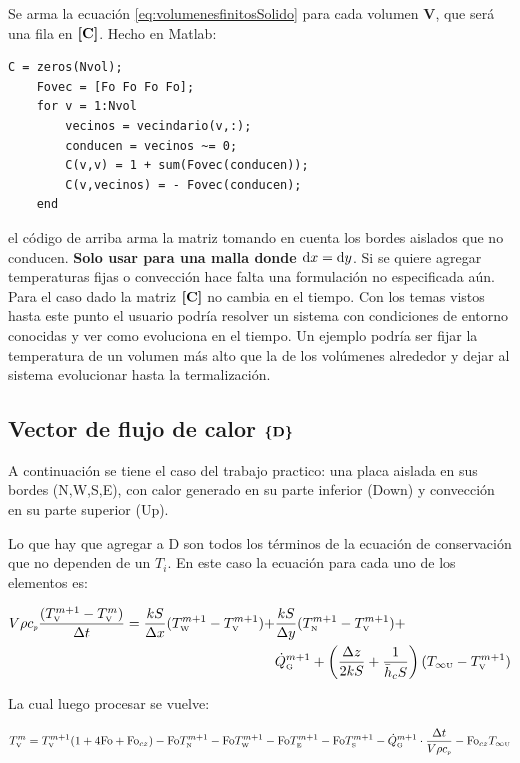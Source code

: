 \documentclass[11pt, titlepage]{article}
\begin{document}
Se arma la ecuación \ref{eq:volumenesfinitosSolido} para cada volumen \textbf{V}, que será una fila en $\boldsymbol{[ } \boldsymbol{ \mathrm{C} } \boldsymbol{] }$. Hecho en Matlab:
\begin{lstlisting}[caption = {Se arma la matriz $\Mme{C}$ para volúmenes cuadrados.}]
    C = zeros(Nvol);
    Fovec = [Fo Fo Fo Fo];
    for v = 1:Nvol
        vecinos = vecindario(v,:);
        conducen = vecinos ~= 0;
        C(v,v) = 1 + sum(Fovec(conducen));
        C(v,vecinos) = - Fovec(conducen);
    end
\end{lstlisting}
el código de arriba arma la matriz tomando en cuenta los bordes aislados que no conducen. \textbf{Solo usar para una malla donde $\mathrm{d} x=\mathrm{d} y$}. Si se quiere agregar temperaturas fijas o convección hace falta una formulación no especificada aún. Para el caso dado la matriz $\boldsymbol{[ } \boldsymbol{ \mathrm{C} } \boldsymbol{] }$ no cambia en el tiempo. Con los temas vistos hasta este punto el usuario podría resolver un sistema con condiciones de entorno conocidas y ver como evoluciona en el tiempo. Un ejemplo podría ser fijar la temperatura de un volumen más alto que la de los volúmenes alrededor y dejar al sistema evolucionar hasta la termalización.

\subsection[Vector de flujo de calor]{Vector de flujo de calor \(\boldsymbol{\{ } \boldsymbol{ \mathrm{D} } \boldsymbol{\} }\)}
A continuación se tiene el caso del trabajo practico: una placa aislada en sus bordes (N,W,S,E), con calor generado en su parte inferior (Down) y convección en su parte superior (Up). 

Lo que hay que agregar a D son todos los términos de la ecuación de conservación que no dependen de un $T_i$. En este caso la ecuación para cada uno de los elementos es:

\begin{align*} \label{eq:volumenesFinitos3Dejemplo}
    V \rho {c_{\textit{\tiny p}}} \frac{(T_{\text{\tiny V}}^{m+1} - T_{\text{\tiny V}}^m )}{\Delta t} =\frac{kS}{\Delta x}(T_{\text{\tiny W}}^{m+1} - T_{\text{\tiny V}}^{m+1}) + &\frac{kS}{\Delta y} (T_{\text{\tiny N}}^{m+1} - T_{\text{\tiny V}}^{m+1}) +\\ &{\dot{Q}_{\text{\tiny G}}}^{m+1} + \left( \frac{\Delta z}{2 k S} + \frac{1}{\bar{h}_{c} S}\right) ( T_{\infty{\ensuremath{\text{\tiny U}}}} - T_{\text{\tiny V}}^{m+1})
\end{align*}

La cual luego procesar se vuelve: 

\begin{equation} \label{eq:volumenesfinitosSolidoConZ}
    T_{\text{\tiny V}}^m = T_{\text{\tiny V}}^{m+1}(1+4{\mathrm{Fo}}+{\mathrm{Fo}}_{cz}) - {\mathrm{Fo}} T_{\text{\tiny N}}^{m+1} - {\mathrm{Fo}} T_{\text{\tiny W}}^{m+1} - {\mathrm{Fo}} T_{\text{\tiny E}}^{m+1} - {\mathrm{Fo}} T_{\text{\tiny S}}^{m+1} - {\dot{Q}_{\text{\tiny G}}}^{m+1}\cdot\frac{\Delta t}{V \rho {c_{\textit{\tiny p}}}} - {\mathrm{Fo}}_{cz} T_{\infty{\ensuremath{\text{\tiny U}}}}
\end{equation}
\end{document}
